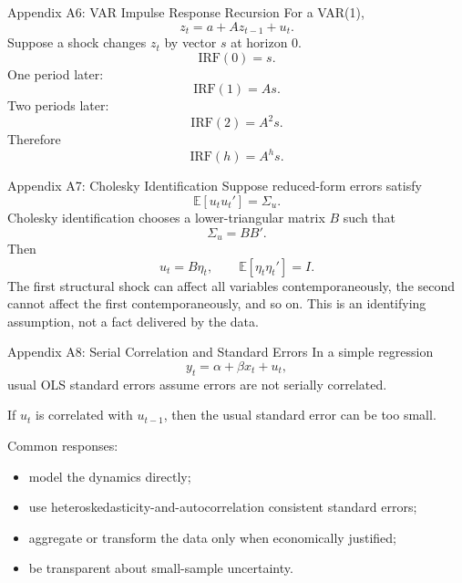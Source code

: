 \documentclass[11pt,aspectratio=169]{beamer}
\newcommand{\E}{\mathbb{E}}
\newcommand{\IRF}{\mathrm{IRF}}
\newcommand{\backbutton}[1]{\vspace{0.4em}\hfill\hyperlink{main:#1}{\beamerbutton{Back to main slide}}}
\begin{document}
\begin{frame}{Appendix A6: VAR Impulse Response Recursion}
  \hypertarget{app:irf-recursion}{}
  For a VAR(1),
  \[
    z_t=a+Az_{t-1}+u_t.
  \]
  Suppose a shock changes \(z_t\) by vector \(s\) at horizon 0.
  \[
    \IRF(0)=s.
  \]
  One period later:
  \[
    \IRF(1)=A s.
  \]
  Two periods later:
  \[
    \IRF(2)=A^2 s.
  \]
  Therefore
  \[
    \IRF(h)=A^h s.
  \]
  \backbutton{irf}
\end{frame}

\begin{frame}{Appendix A7: Cholesky Identification}
  Suppose reduced-form errors satisfy
  \[
    \E[u_tu_t']=\Sigma_u.
  \]
  Cholesky identification chooses a lower-triangular matrix \(B\) such that
  \[
    \Sigma_u=BB'.
  \]
  Then
  \[
    u_t=B\eta_t,\qquad \E[\eta_t\eta_t']=I.
  \]
  The first structural shock can affect all variables contemporaneously, the second cannot affect the first contemporaneously, and so on. This is an identifying assumption, not a fact delivered by the data.
\end{frame}

\begin{frame}{Appendix A8: Serial Correlation and Standard Errors}
  In a simple regression
  \[
    y_t=\alpha+\beta x_t+u_t,
  \]
  usual OLS standard errors assume errors are not serially correlated.

  If \(u_t\) is correlated with \(u_{t-1}\), then the usual standard error can be too small.

  Common responses:
  \begin{itemize}
    \item model the dynamics directly;
    \item use heteroskedasticity-and-autocorrelation consistent standard errors;
    \item aggregate or transform the data only when economically justified;
    \item be transparent about small-sample uncertainty.
  \end{itemize}
\end{frame}
\end{document}
